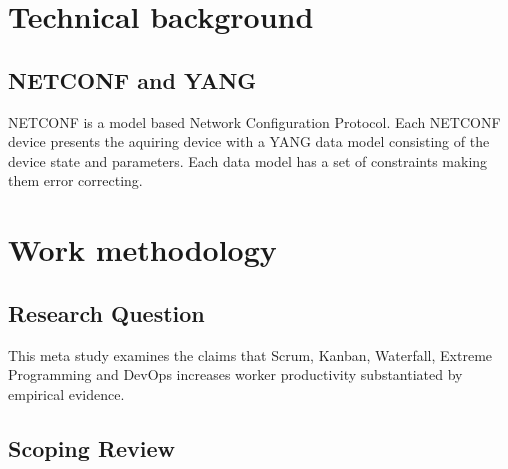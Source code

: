 \documentclass[12pt]{article}
\begin{document}
\section{Technical background}

\subsection{NETCONF and YANG}
NETCONF \cite{ennsNetworkConfigurationProtocol2011} is a model based Network Configuration Protocol.
Each NETCONF device presents the aquiring device with a YANG \cite{bjorklundYANG11Data2016} data model
consisting of the device state and parameters. 
Each data model has a set of constraints making them error correcting.

\section{Work methodology}

\subsection{Research Question}
This meta study examines the claims that Scrum, Kanban, Waterfall, Extreme Programming and DevOps 
increases worker productivity substantiated by empirical evidence.


\subsection{Scoping Review}
\end{document}

